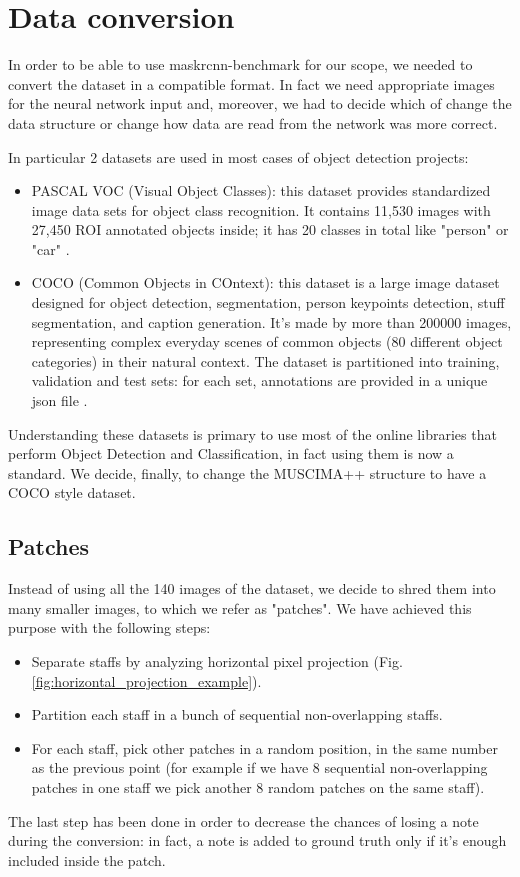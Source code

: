 \documentclass[journal]{IEEEtran}
\begin{document}
	\section{Data conversion}
	In order to be able to use maskrcnn-benchmark for our scope, we needed to convert the dataset in a compatible format. In fact we need appropriate images for the neural network input and, moreover, we had to decide which of change the data structure or change how data are read from the network was more correct.
	
	In particular 2 datasets are used in most cases of object detection projects:
	\begin{itemize}
		\item PASCAL VOC (Visual Object Classes): this dataset provides standardized image data sets for object class recognition. It contains 11,530 images with 27,450 ROI annotated objects inside; it has 20 classes in total like "person" or "car" \cite{VOC-LINK}.
		\item COCO (Common Objects in COntext): this dataset is a large image dataset designed for object detection, segmentation, person keypoints detection, stuff segmentation, and caption generation. It's made by more than 200000 images, representing complex everyday scenes of common objects (80 different object categories) in their natural context. The dataset is partitioned into training, validation and test sets: for each set, annotations are provided in a unique json file \cite{COCO-LINK}.
	\end{itemize}
	Understanding these datasets is primary to use most of the online libraries that perform Object Detection and Classification, in fact using them is now a standard. We decide, finally, to change the MUSCIMA++ structure to have a COCO style dataset.

	\newpage	
	\subsection{Patches}
	Instead of using all the 140 images of the dataset, we decide to shred them into many smaller images, to which we refer as "patches". We have achieved this purpose with the following steps:
	\begin{itemize}
		\item Separate staffs by analyzing horizontal pixel projection (Fig. \ref{fig:horizontal_projection_example}).
		\item Partition each staff in a bunch of sequential non-overlapping staffs.
		\item For each staff, pick other patches in a random position, in the same number as the previous point (for example if we have 8 sequential non-overlapping patches in one staff we pick another 8 random patches on the same staff).
	\end{itemize}
	The last step has been done in order to decrease the chances of losing a note during the conversion: in fact, a note is added to ground truth only if it's enough included inside the patch. 
	
\end{document}
